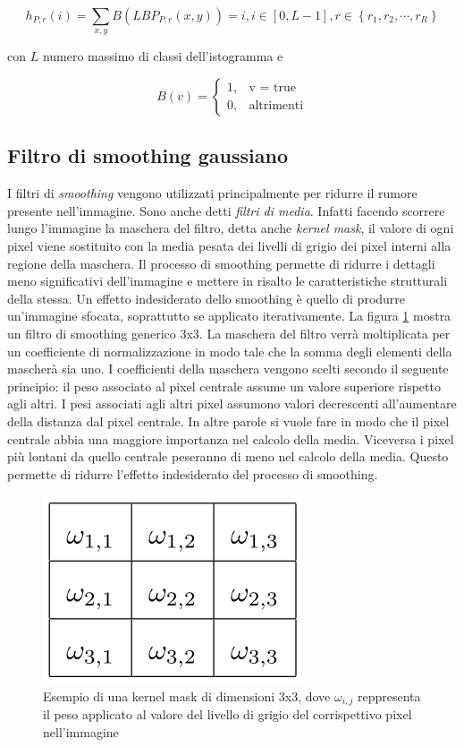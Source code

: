 \begin{equation}
h_{P,r}(i) = \sum_{x, y} B(LBP_{P,r}(x, y)) = i, i \in  [0, L-1 ], r \in \left\lbrace  r_1, r_2, \cdots, r_R \right\rbrace
\end{equation}

\noindent con $L$ numero massimo di classi dell'istogramma e

\begin{equation}
B(v) = 	\begin{cases} 1, & \mbox{v = true} \\ 0, & \mbox{altrimenti} \end{cases}
\end{equation}

\subsection{Filtro di smoothing gaussiano}
I filtri di \emph{smoothing} vengono utilizzati principalmente per ridurre il rumore presente nell'immagine. Sono anche detti \emph{filtri di media}. Infatti facendo scorrere lungo l'immagine la maschera del filtro, detta anche \emph{kernel mask}, il valore di ogni pixel viene sostituito con la media pesata dei livelli di grigio dei pixel interni alla regione della maschera. Il processo di smoothing permette di ridurre i dettagli meno significativi dell'immagine e mettere in risalto le caratteristiche strutturali della stessa.
Un effetto indesiderato dello smoothing è quello di produrre un'immagine sfocata, soprattutto se applicato iterativamente.
La figura \ref{fig:kernelMask} mostra un filtro di smoothing generico 3x3. La maschera del filtro verrà moltiplicata per un coefficiente di normalizzazione in modo tale che la somma degli elementi della mascherà sia uno. I coefficienti della maschera vengono scelti secondo il seguente principio: il peso associato al pixel centrale assume un valore superiore rispetto agli altri. I pesi associati agli altri pixel assumono valori decrescenti all'aumentare della distanza dal pixel centrale. In altre parole si vuole fare in modo che il pixel centrale abbia una maggiore importanza nel calcolo della media. Viceversa i pixel più lontani da quello centrale peseranno di meno nel calcolo della media. Questo permette di ridurre l'effetto indesiderato del processo di smoothing.

\begin{figure}[ht]
\begin{center}
\includegraphics[width=.3\textwidth]{img/kernel_mask}
\caption{ Esempio di una kernel mask di dimensioni 3x3, dove $\omega_{i,j}$ reppresenta il peso applicato al valore del livello di grigio del corrispettivo pixel nell'immagine}
\label{fig:kernelMask}
\end{center}
\end{figure}

